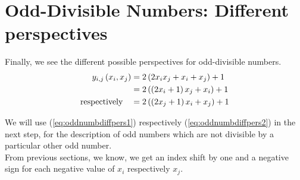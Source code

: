 \section{Odd-Divisible Numbers: Different perspectives}
\label{s:odddivisiblenumbersdiffperspectives}
Finally, we see the different possible perspectives for odd-divisible numbers.
\begin{alignat}{3}
	y_{i,j}\left(x_{i},x_{j}\right) &= 2\left(2x_{i}x_{j} + x_{i} + x_{j}\right) + 1 \notag \\
	&= 2\left(\left(2x_{i} + 1\right)x_{j} + x_{i}\right) + 1 \label{eq:oddnumbdiffpers1}\\
	\mathrm{respectively} \quad &= 2\left(\left(2x_{j} + 1\right)x_{i} + x_{j}\right) + 1
\label{eq:oddnumbdiffpers2}
\end{alignat}

We will use (\ref{eq:oddnumbdiffpers1}) respectively (\ref{eq:oddnumbdiffpers2}) in the next step, for the description of odd numbers which are not divisible by a particular other odd number.\\
From previous sections, we know, we get an index shift by one and a negative sign for each negative value of $x_{i}$ respectively $x_{j}$.





















